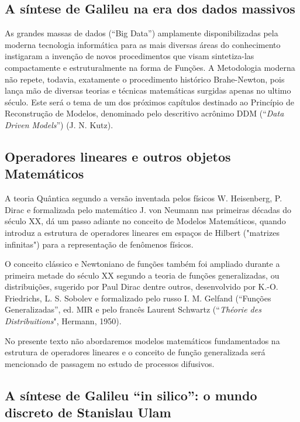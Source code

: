 \subsection{A síntese de Galileu na era dos dados massivos}

    As grandes massas de dados (``Big Data'') amplamente disponibilizadas pela moderna tecnologia informática para as mais diversas áreas do conhecimento instigaram a invenção de novos procedimentos que visam sintetiza-las compactamente e estruturalmente na forma de Funções. A Metodologia moderna não repete, todavia, exatamente o procedimento histórico Brahe-Newton, pois lança mão de diversas teorias e técnicas matemáticas surgidas apenas no ultimo século. Este será o tema de um dos próximos capítulos destinado ao Princípio de Reconstrução de Modelos, denominado pelo descritivo acrônimo DDM (``\textit{Data Driven Models}'') (J. N. Kutz).

\subsection{Operadores lineares e outros objetos Matemáticos}

    A teoria Quântica segundo a versão inventada pelos físicos W. Heisenberg, P. Dirac e formalizada pelo matemático J. von Neumann nas primeiras décadas do século XX, dá um passo adiante no conceito de Modelos Matemáticos, quando introduz a estrutura de operadores lineares em espaços de Hilbert ("matrizes infinitas") para a representação de fenômenos físicos.

    O conceito clássico e Newtoniano de funções também foi ampliado durante a primeira metade do século XX segundo a teoria de funções generalizadas, ou distribuições, sugerido por Paul Dirac dentre outros, desenvolvido por K.-O. Friedrichs, L. S. Sobolev e formalizado pelo russo I. M. Gelfand (``Funções Generalizadas'', ed. MIR e pelo francês Laurent Schwartz (``\textit{Théorie des Distribuitions}", Hermann, 1950).

    No presente texto não abordaremos modelos matemáticos fundamentados na estrutura de operadores lineares e o conceito de função generalizada será mencionado de passagem no estudo de processos difusivos.

\subsection{A síntese de Galileu ``in silico'': o mundo discreto de Stanislau Ulam}

